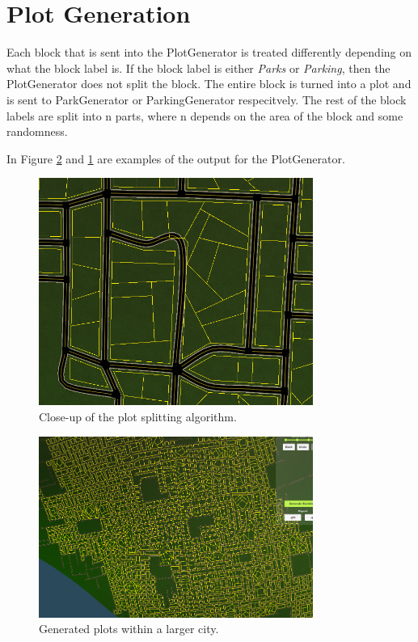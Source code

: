 \section{Plot Generation}
Each block that is sent into the PlotGenerator is treated differently depending on what the block label is. 
If the block label is either \textit{Parks} or \textit{Parking}, then the PlotGenerator does not split the block. 
The entire block is turned into a plot and is sent to ParkGenerator or ParkingGenerator respecitvely.
The rest of the block labels are split into n parts, where n depends on the area of the block and some randomness. 

In Figure \ref{fig:plot} and \ref{fig:plot2} are examples of the output for the PlotGenerator.

\begin{figure}[H]
  \centering

  \includegraphics[width=0.8\textwidth]{figure/plot2.png}
  \caption{Close-up of the plot splitting algorithm.}

  \label{fig:plot2}
\end{figure}

\begin{figure}[H]
  \centering

  \includegraphics[width=0.8\textwidth]{figure/plot.png}
  \caption{Generated plots within a larger city.}

  \label{fig:plot}
\end{figure}


